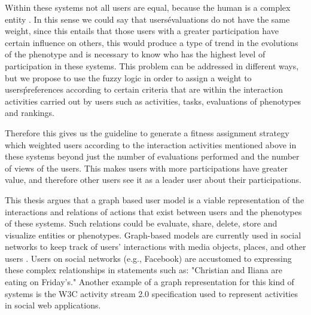 \par Within these systems not all users are equal, because the human is a complex
entity \cite{mitchell2009complexity}. In this sense we could say that users\'
evaluations do not have the same weight, since this entails
that those users with a greater participation have certain influence on others, 
this would produce a
type of trend in the evolutions of the phenotype and is necessary to know who
has the highest level of participation in these systems. This problem can be
addressed in different ways, but we propose to use the fuzzy logic
\cite{Zadeh1973}\cite{TakagiSugeno1983}\cite{ohsaki1998input} in order to assign
a weight to users\' preferences according to certain criteria that are within the
interaction activities carried out by users such as activities, tasks,
evaluations of phenotypes and rankings.

\par Therefore this gives us the guideline to generate a fitness assignment
strategy which weighted users according to the interaction activities mentioned
above in these systems beyond just the number of evaluations performed and the
number of views of the users. This makes users with more participations have
greater value, and therefore other users see it as a leader user about their
participations.

\par This thesis argues that a graph based user model is a viable representation of
the interactions and relations of actions that exist between users
and the phenotypes of these systems. Such relations could be evaluate, share, delete,
store and visualize entities or phenotypes. Graph-based models are currently
used in social networks to
keep track of users' interactions with media objects, places, and other users
\cite{bondy1976graph, miller2013graph, holzschuher2013performance}. Users on
social networks (e.g., Facebook) are accustomed to expressing these
complex relationships in statements such as: "Christian and Iliana are eating on
Friday's." Another example of a graph representation for this kind 
of systems is the W3C activity stream 2.0 specification used to
represent activities in social web applications.

